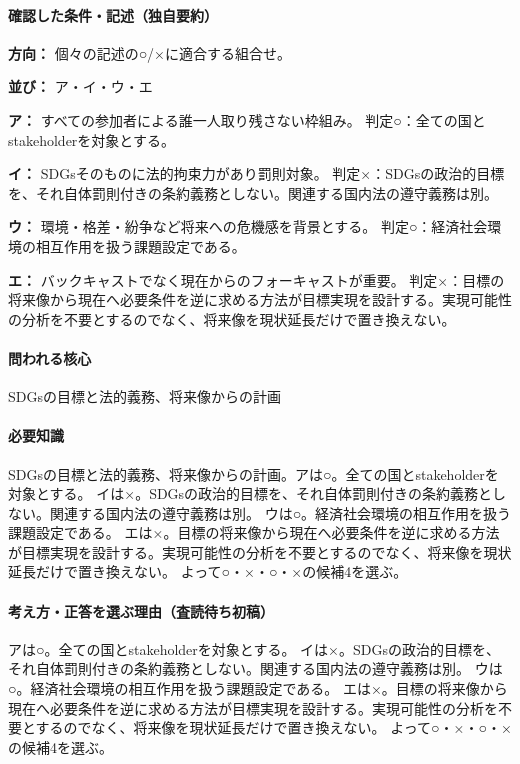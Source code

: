 \paragraph{確認した条件・記述（独自要約）}\mbox{}\par

\noindent\textbf{方向：} 個々の記述の○/×に適合する組合せ。\par

\noindent\textbf{並び：} ア・イ・ウ・エ\par

\noindent\textbf{ア：} すべての参加者による誰一人取り残さない枠組み。 判定○：全ての国とstakeholderを対象とする。\par

\noindent\textbf{イ：} SDGsそのものに法的拘束力があり罰則対象。 判定×：SDGsの政治的目標を、それ自体罰則付きの条約義務としない。関連する国内法の遵守義務は別。\par

\noindent\textbf{ウ：} 環境・格差・紛争など将来への危機感を背景とする。 判定○：経済社会環境の相互作用を扱う課題設定である。\par

\noindent\textbf{エ：} バックキャストでなく現在からのフォーキャストが重要。 判定×：目標の将来像から現在へ必要条件を逆に求める方法が目標実現を設計する。実現可能性の分析を不要とするのでなく、将来像を現状延長だけで置き換えない。\par

\paragraph{問われる核心} SDGsの目標と法的義務、将来像からの計画

\paragraph{必要知識} SDGsの目標と法的義務、将来像からの計画。アは○。全ての国とstakeholderを対象とする。 イは×。SDGsの政治的目標を、それ自体罰則付きの条約義務としない。関連する国内法の遵守義務は別。 ウは○。経済社会環境の相互作用を扱う課題設定である。 エは×。目標の将来像から現在へ必要条件を逆に求める方法が目標実現を設計する。実現可能性の分析を不要とするのでなく、将来像を現状延長だけで置き換えない。 よって○・×・○・×の候補4を選ぶ。

\paragraph{考え方・正答を選ぶ理由（査読待ち初稿）} アは○。全ての国とstakeholderを対象とする。 イは×。SDGsの政治的目標を、それ自体罰則付きの条約義務としない。関連する国内法の遵守義務は別。 ウは○。経済社会環境の相互作用を扱う課題設定である。 エは×。目標の将来像から現在へ必要条件を逆に求める方法が目標実現を設計する。実現可能性の分析を不要とするのでなく、将来像を現状延長だけで置き換えない。 よって○・×・○・×の候補4を選ぶ。

